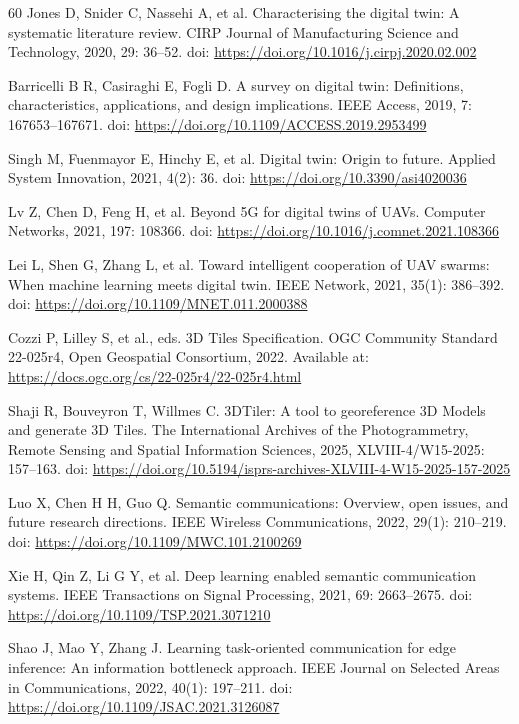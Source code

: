 \documentclass[fleqn]{VRIH2025}
\begin{document}
\begin{thebibliography}{60}
Jones D, Snider C, Nassehi A, et al. Characterising the digital twin: A systematic literature review. CIRP Journal of Manufacturing Science and Technology, 2020, 29: 36--52. doi: \url{https://doi.org/10.1016/j.cirpj.2020.02.002}

Barricelli B R, Casiraghi E, Fogli D. A survey on digital twin: Definitions, characteristics, applications, and design implications. IEEE Access, 2019, 7: 167653--167671. doi: \url{https://doi.org/10.1109/ACCESS.2019.2953499}

Singh M, Fuenmayor E, Hinchy E, et al. Digital twin: Origin to future. Applied System Innovation, 2021, 4(2): 36. doi: \url{https://doi.org/10.3390/asi4020036}

Lv Z, Chen D, Feng H, et al. Beyond 5G for digital twins of UAVs. Computer Networks, 2021, 197: 108366. doi: \url{https://doi.org/10.1016/j.comnet.2021.108366}

Lei L, Shen G, Zhang L, et al. Toward intelligent cooperation of UAV swarms: When machine learning meets digital twin. IEEE Network, 2021, 35(1): 386--392. doi: \url{https://doi.org/10.1109/MNET.011.2000388}

Cozzi P, Lilley S, et al., eds. 3D Tiles Specification. OGC Community Standard 22-025r4, Open Geospatial Consortium, 2022. Available at: \url{https://docs.ogc.org/cs/22-025r4/22-025r4.html}

Shaji R, Bouveyron T, Willmes C. 3DTiler: A tool to georeference 3D Models and generate 3D Tiles. The International Archives of the Photogrammetry, Remote Sensing and Spatial Information Sciences, 2025, XLVIII-4/W15-2025: 157--163. doi: \url{https://doi.org/10.5194/isprs-archives-XLVIII-4-W15-2025-157-2025}

Luo X, Chen H H, Guo Q. Semantic communications: Overview, open issues, and future research directions. IEEE Wireless Communications, 2022, 29(1): 210--219. doi: \url{https://doi.org/10.1109/MWC.101.2100269}

Xie H, Qin Z, Li G Y, et al. Deep learning enabled semantic communication systems. IEEE Transactions on Signal Processing, 2021, 69: 2663--2675. doi: \url{https://doi.org/10.1109/TSP.2021.3071210}

Shao J, Mao Y, Zhang J. Learning task-oriented communication for edge inference: An information bottleneck approach. IEEE Journal on Selected Areas in Communications, 2022, 40(1): 197--211. doi: \url{https://doi.org/10.1109/JSAC.2021.3126087}


\end{thebibliography}
\end{document}

